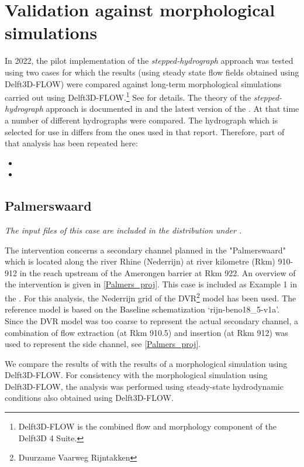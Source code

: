 \chapter{Validation against morphological simulations} \label{Chp:Morphology}

In 2022, the pilot implementation of the \emph{stepped-hydrograph} approach was tested using two cases for which the \dfastmi results (using steady state flow fields obtained using Delft3D-FLOW) were compared against long-term morphological simulations carried out using Delft3D-FLOW.\footnote{Delft3D-FLOW is the combined flow and morphology component of the Delft3D 4 Suite.}
See \citet{GiriJagers2022} for details.
The theory of the \emph{stepped-hydrograph} approach is documented in \citet{JagersGiri2022} and the latest version of the \citet{um}.
At that time a number of different hydrographs were compared.
The hydrograph which is selected for use in  differs from the ones used in that report.
Therefore, part of that analysis has been repeated here:

\begin{itemize}
\item {}
\item {}
\end{itemize}

\section{Palmerswaard} \label{Sec:Palmerswaard}

\emph{The input files of this case are included in the distribution under .}

The intervention concerns a secondary channel planned in the "Palmerswaard" which is located along the river Rhine (Nederrijn) at river kilometre (Rkm) 910-912 in the reach upstream of the Amerongen barrier at Rkm 922.
An overview of the intervention is given in \autoref{Palmers_proj}.
This case is included as Example 1 in the \citet{um}.
For this analysis, the Nederrijn grid of the DVR\footnote{Duurzame Vaarweg Rijntakken} model has been used.
The reference model is based on the Baseline schematization `rijn-beno18\_5-v1a'.
Since the DVR model was too coarse to represent the actual secondary channel, a combination of flow extraction (at Rkm 910.5) and insertion (at Rkm 912) was used to represent the side channel, see \autoref{Palmers_proj}.

We compare the results of \dfmi with the results of a morphological simulation using Delft3D-FLOW.
For consistency with the morphological simulation using Delft3D-FLOW, the \dfmi analysis was performed using steady-state hydrodynamic conditions also obtained using Delft3D-FLOW.

